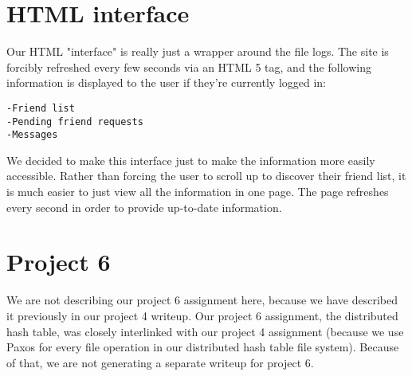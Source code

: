 \documentclass[11pt]{article}
\begin{document}
\section{HTML interface}

Our HTML "interface" is really just a wrapper around the file logs. The site is forcibly refreshed every few seconds via an HTML 5 tag, and the following information is displayed to the user if they're currently logged in:

\begin{verbatim}
-Friend list
-Pending friend requests
-Messages
\end{verbatim}

We decided to make this interface just to make the information more easily accessible. Rather than forcing the user to scroll up to discover their friend list, it is much easier to just view all the information in one page. The page refreshes every second in order to provide up-to-date information.

\section{Project 6}

We are not describing our project 6 assignment here, because we have described it previously in our project 4 writeup. Our project 6 assignment, the distributed hash table, was closely interlinked with our project 4 assignment (because we use Paxos for every file operation in our distributed hash table file system). Because of that, we are not generating a separate writeup for project 6.
\end{document}

